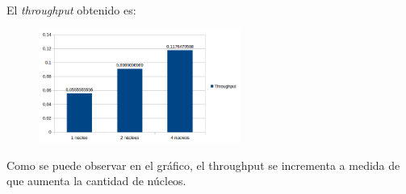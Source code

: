 El \emph{throughput} obtenido es:
\begin{figure}[!h]
	\begin{center}
		\includegraphics[width=250px]{imagenes/ej2_throughput.png}

		\label{fig:grafico_ej2_throughput}
	\end{center}
\end{figure}

Como se puede observar en el gráfico, el throughput se incrementa a medida de que aumenta la cantidad de núcleos.

